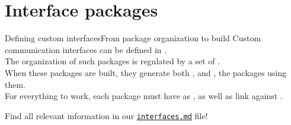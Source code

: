 
\section{Interface packages}

\begin{frame}{Defining custom interfaces}{From package organization to build}
  \justifying
  Custom communication interfaces can be defined in .\\
  \bigskip
  The organization of such packages is regulated by a set of .\\
  \bigskip
  When these packages are built, they generate both , and , the packages using them.\\
  \bigskip
  For everything to work, each package must have  as , as well as link against .\\
  \bigskip
  \begin{block}{}
    \centering
    Find all relevant information in our \href{https://github.com/IntelligentSystemsLabUTV/ros2-examples/blob/jazzy/interfaces.md}{\color{blue}\underline{\texttt{interfaces.md}}} file!
  \end{block}
\end{frame}

